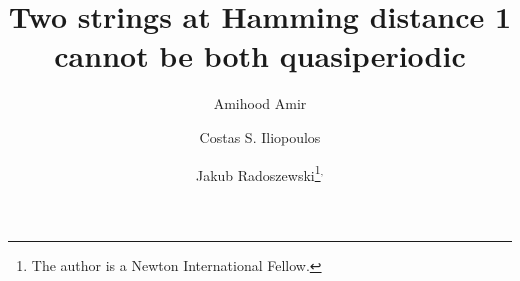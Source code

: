 \usepackage{fullpage}
\usepackage{amsthm,amssymb,amsmath}  
\usepackage{comment,xspace,enumerate}
\usepackage[capitalise]{cleveref}
\usepackage[utf8]{inputenc}
\usepackage{thmtools}
\usepackage{thm-restate}
\usepackage{authblk}


\newcommand{\myparagraph}[1]{\paragraph{#1.}}

 
  \theoremstyle{plain}
  \newtheorem{theorem}{Theorem}
  \newtheorem{lemma}{Lemma}  
  \newtheorem{corollary}[theorem]{Corollary}  
  \newtheorem{fact}{Fact}
  \newtheorem{observation}{Observation}
  \theoremstyle{definition}
  \newtheorem{definition}[theorem]{Definition}
  \newtheorem{example}{Example}
  \newtheorem{remark}[definition]{Remark}
 
  \newtheorem*{claim}{Claim}
 
\title{Two strings at Hamming distance 1 cannot be both quasiperiodic}
\author[1]{Amihood Amir}
\author[2]{Costas S. Iliopoulos}
\author[2,3]{Jakub Radoszewski\footnote{The author is a Newton International Fellow.}$^{,}$}


\date{\vspace{-5ex}}

